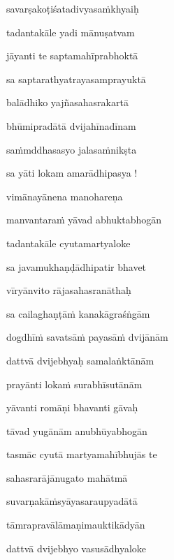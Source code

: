 \nemslokad 
savarṣakoṭiśatadivyasaṁkhyaiḥ \veg\dontdisplaylinenum

\ujvers\nemsloka 
tadantakāle yadi mānuṣatvam
\dontdisplaylinenum

\nemslokab 
jāyanti te saptamahīprabhoktā \danda\dontdisplaylinenum

\nemslokac 
sa saptarathyatrayasamprayuktā
\dontdisplaylinenum

\nemslokad 
balādhiko yajñasahasrakartā \veg\dontdisplaylinenum

\ujvers\nemsloka 
bhūmipradātā dvijahīnadīnam
\dontdisplaylinenum

\nemslokab 
saṁmddhasasyo jalasaṁnikṣta \danda\dontdisplaylinenum

\nemslokac 
sa yāti lokam amarādhipasya !
\dontdisplaylinenum

\nemslokad 
vimānayānena manohareṇa \veg\dontdisplaylinenum

\ujvers\nemsloka 
manvantaraṁ yāvad abhuktabhogān
\dontdisplaylinenum

\nemslokab 
tadantakāle cyutamartyaloke \danda\dontdisplaylinenum

\nemslokac 
sa javamukhaṇḍādhipatir bhavet
\dontdisplaylinenum

\nemslokad 
vīryānvito rājasahasranāthaḥ \veg\dontdisplaylinenum

\ujvers\nemsloka 
sa cailaghaṇṭāṁ kanakāgraśṅgām
\dontdisplaylinenum

\nemslokab 
dogdhīṁ savatsāṁ payasāṁ dvijānām \danda\dontdisplaylinenum

\nemslokac 
dattvā dvijebhyaḥ samalaṅktānām
\dontdisplaylinenum

\nemslokad 
prayānti lokaṁ surabhīsutānām \veg\dontdisplaylinenum

\ujvers\nemsloka 
yāvanti romāṇi bhavanti gāvaḥ
\dontdisplaylinenum

\nemslokab 
tāvad yugānām anubhūyabhogān \danda\dontdisplaylinenum

\nemslokac 
tasmāc cyutā martyamahībhujās te
\dontdisplaylinenum

\nemslokad 
sahasrarājānugato mahātmā \veg\dontdisplaylinenum
{}

\ujvers\nemsloka 
suvarṇakāṁsyāyasaraupyadātā
\dontdisplaylinenum

\nemslokab 
tāmrapravālāmaṇimauktikādyān \danda\dontdisplaylinenum

\nemslokac 
dattvā dvijebhyo vasusādhyaloke
\dontdisplaylinenum

